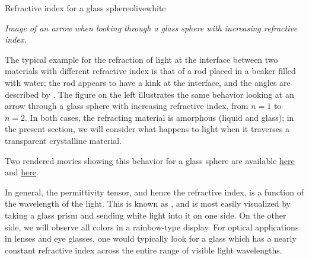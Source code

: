 \begin{messagebox}{Refractive index for a glass sphere}{olive}{\icinfo}{white}
\begin{minipage}{0.45\textwidth}
\vspace{.8em}

\vspace{.7em}

\em Image of an arrow when looking through a glass sphere with increasing refractive index.\label{pageglasssphere}
\end{minipage}\hspace{1em}
\begin{minipage}{0.5\textwidth}
The typical example for the refraction of light at the interface between two materials with different refractive index is that of a rod placed in a beaker filled with water; the rod appears to have a kink at the interface, and the angles are described by .  The figure on the left illustrates the same behavior looking at an arrow through a glass sphere with increasing refractive index, from $n=1$ to $n=2$.  In both cases, the refracting material is amorphous (liquid and glass); in the present section, we will consider what happens to light when it traverses a transparent crystalline material.

Two rendered movies showing this behavior for a glass sphere are available \href{http://neon.materials.cmu.edu/degraef/27301/GlassSphere1.html}{here} and  \href{http://neon.materials.cmu.edu/degraef/27301/GlassSphere2.html}{here}.
\end{minipage}
\end{messagebox}


In general, the permittivity tensor, and hence the refractive index, is a function of the wavelength of the light.  This is known as , and is most easily visualized by taking a glass prism and sending white light into it on one side.  On the other side, we will observe all colors in a rainbow-type display.  For optical applications in lenses and eye glasses, one would typically look for a glass which has a nearly constant refractive index across the entire range of visible light wavelengths.

